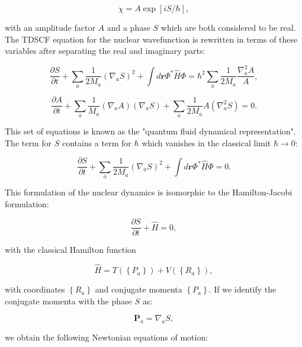 \begin{equation}
 \chi = A \exp[iS/\hbar] , 
\end{equation}

with an amplitude factor $A$ and a phase $S$
which are both considered to be real.
The TDSCF equation for the nuclear wavefunction is rewritten 
in terms of these variables after separating the real
and imaginary parts:

\begin{equation}
 \frac{\partial S}{\partial t} + \sum_a \frac{1}{2M_a}
    (\nabla_a S)^2 + \int d\bm{r} \Phi^* \hat{H} \Phi
    = \hbar^2 \sum_a \frac{1}{2M_a} \frac{\nabla_a^2 A}{A} , 
\end{equation}

\begin{equation}
 \frac{\partial A}{\partial t} + \sum_a \frac{1}{M_a} (\nabla_a A)
    (\nabla_a S) + \sum_a \frac{1}{2M_a} A (\nabla_a^2 S) = 0 . 
\end{equation}

This set of equations is known as the "quantum fluid dynamical representation".
The term for $S$ contains a term for $\hbar$ which vanishes in
the classical limit $\hbar \rightarrow 0$:

\begin{equation}
 \frac{\partial S}{\partial t} + \sum_a \frac{1}{2M_a}
    (\nabla_a S)^2 + \int d\bm{r} \Phi^* \hat{H} \Phi = 0 . 
\end{equation}

This formulation of the nuclear dynamics is isomorphic
to the Hamilton-Jacobi formulation:

\begin{equation}
 \frac{\partial S}{\partial t} + \hat{H} = 0 , 
\end{equation}

with the classical Hamilton function

\begin{equation}
 \hat{H} = T(\left\{P_a\right\}) + V(\left\{R_a\right\}) , 
\end{equation}

with coordinates $\left\{R_a\right\}$ and conjugate momenta 
$\left\{P_a\right\}$.
If we identify the conjugate momenta with the phase $S$ as:

\begin{equation}
 \bm{P}_a = \nabla_a S , 
\end{equation}

we obtain the following Newtonian equations of motion:

